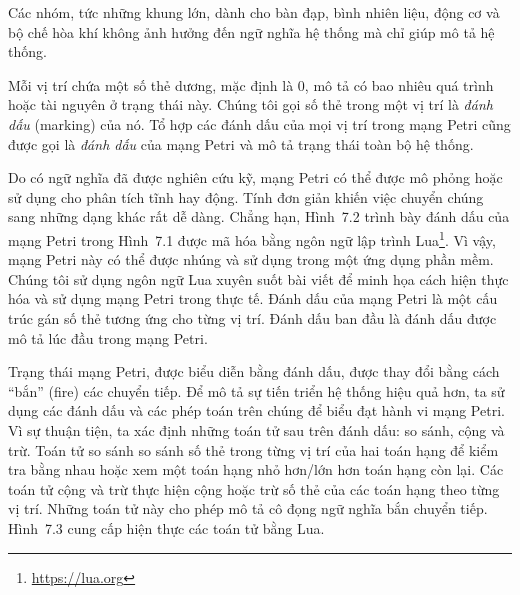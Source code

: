 Các nhóm, tức những khung lớn, dành cho bàn đạp, bình nhiên liệu, động cơ và bộ chế hòa khí không ảnh hưởng đến ngữ nghĩa hệ thống mà chỉ giúp mô tả hệ thống.


Mỗi vị trí chứa một số thẻ dương, mặc định là 0, mô tả có bao nhiêu quá trình hoặc tài nguyên ở trạng thái này. Chúng tôi gọi số thẻ trong một vị trí là \emph{đánh dấu} (marking) của nó. Tổ hợp các đánh dấu của mọi vị trí trong mạng Petri cũng được gọi là \emph{đánh dấu} của mạng Petri và mô tả trạng thái toàn bộ hệ thống.

Do có ngữ nghĩa đã được nghiên cứu kỹ, mạng Petri có thể được mô phỏng hoặc sử dụng cho phân tích tĩnh hay động. Tính đơn giản khiến việc chuyển chúng sang những dạng khác rất dễ dàng. Chẳng hạn, Hình~7.2 trình bày đánh dấu của mạng Petri trong Hình~7.1 được mã hóa bằng ngôn ngữ lập trình Lua\footnote{\url{https://lua.org}}. Vì vậy, mạng Petri này có thể được nhúng
và sử dụng trong một ứng dụng phần mềm. Chúng tôi sử dụng ngôn ngữ Lua xuyên suốt bài viết để minh họa cách hiện thực hóa và sử dụng mạng Petri trong thực tế. Đánh dấu của mạng Petri là một cấu trúc gán số thẻ tương ứng cho từng vị trí. Đánh dấu ban đầu là đánh dấu được mô tả lúc đầu trong mạng Petri.


Trạng thái mạng Petri, được biểu diễn bằng đánh dấu, được thay đổi bằng cách ``bắn'' (fire) các chuyển tiếp. Để mô tả sự tiến triển hệ thống hiệu quả hơn, ta sử dụng các đánh dấu và các phép toán trên chúng để biểu đạt hành vi mạng Petri. Vì sự thuận tiện, ta xác định những toán tử sau trên đánh dấu: so sánh, cộng và trừ. Toán tử so sánh so sánh số thẻ trong từng vị trí của hai toán hạng để kiểm tra bằng nhau hoặc xem một toán hạng nhỏ hơn/lớn hơn toán hạng còn lại. Các toán tử cộng và trừ thực hiện cộng hoặc trừ số thẻ của các toán hạng theo từng vị trí. Những toán tử này cho phép mô tả cô đọng ngữ nghĩa bắn chuyển tiếp. Hình~7.3 cung cấp hiện thực các toán tử bằng Lua.

